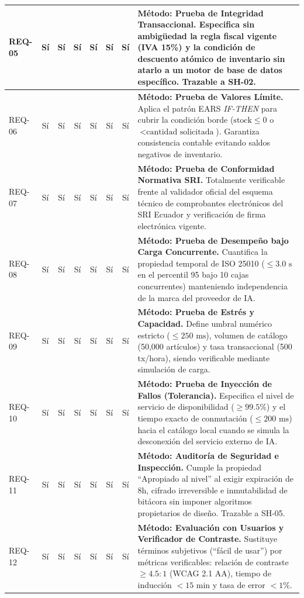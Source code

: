 \begin{table}[htbp]
\begin{tabularx}{\textwidth}{l c c c c c c Y}
		\midrule
		REQ-05 & Sí & Sí & Sí & Sí & Sí & Sí & \textbf{Método: Prueba de Integridad Transaccional.} Especifica sin ambigüedad la regla fiscal vigente (IVA 15\%) y la condición de descuento atómico de inventario sin atarlo a un motor de base de datos específico. Trazable a SH-02. \\
		\midrule
		REQ-06 & Sí & Sí & Sí & Sí & Sí & Sí & \textbf{Método: Prueba de Valores Límite.} Aplica el patrón EARS \textit{IF-THEN} para cubrir la condición borde ($\text{stock} \le 0$ o $< \text{cantidad solicitada}$). Garantiza consistencia contable evitando saldos negativos de inventario. \\
		\midrule
		REQ-07 & Sí & Sí & Sí & Sí & Sí & Sí & \textbf{Método: Prueba de Conformidad Normativa SRI.} Totalmente verificable frente al validador oficial del esquema técnico de comprobantes electrónicos del SRI Ecuador y verificación de firma electrónica vigente. \\
		\midrule
		REQ-08 & Sí & Sí & Sí & Sí & Sí & Sí & \textbf{Método: Prueba de Desempeño bajo Carga Concurrente.} Cuantifica la propiedad temporal de ISO 25010 ($\le 3.0\text{ s}$ en el percentil 95 bajo 10 cajas concurrentes) manteniendo independencia de la marca del proveedor de IA. \\
		\midrule
		REQ-09 & Sí & Sí & Sí & Sí & Sí & Sí & \textbf{Método: Prueba de Estrés y Capacidad.} Define umbral numérico estricto ($\le 250\text{ ms}$), volumen de catálogo (50,000 artículos) y tasa transaccional (500 tx/hora), siendo verificable mediante simulación de carga. \\
		\midrule
		REQ-10 & Sí & Sí & Sí & Sí & Sí & Sí & \textbf{Método: Prueba de Inyección de Fallos (Tolerancia).} Especifica el nivel de servicio de disponibilidad ($\ge 99.5\%$) y el tiempo exacto de conmutación ($\le 200\text{ ms}$) hacia el catálogo local cuando se simula la desconexión del servicio externo de IA. \\
		\midrule
		REQ-11 & Sí & Sí & Sí & Sí & Sí & Sí & \textbf{Método: Auditoría de Seguridad e Inspección.} Cumple la propiedad ``Apropiado al nivel'' al exigir expiración de 8h, cifrado irreversible e inmutabilidad de bitácora sin imponer algoritmos propietarios de diseño. Trazable a SH-05. \\
		\midrule
		REQ-12 & Sí & Sí & Sí & Sí & Sí & Sí & \textbf{Método: Evaluación con Usuarios y Verificador de Contraste.} Sustituye términos subjetivos (``fácil de usar'') por métricas verificables: relación de contraste $\ge 4.5:1$ (WCAG 2.1 AA), tiempo de inducción $< 15\text{ min}$ y tasa de error $< 1\%$. \\

\end{tabularx}
\end{table}
